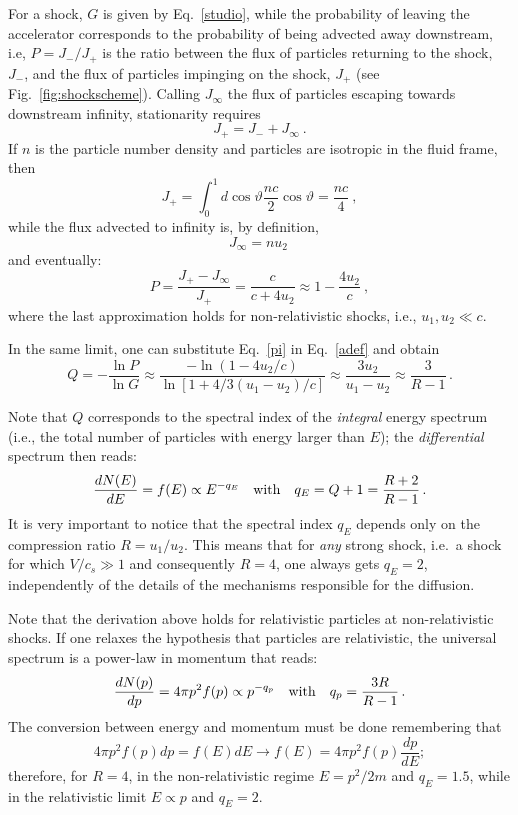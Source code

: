 \documentclass[varenna]{cimento}
\begin{document}
For a shock, $G$ is given by Eq.~\ref{studio}, while the probability of leaving the accelerator corresponds to the probability of being advected away downstream, i.e, $P=J_-/J_+$ is the ratio between the flux of particles returning to the shock, $J_-$, and the flux of particles impinging on the shock, $J_+$ (see Fig.~\ref{fig:shockscheme}).
Calling $J_\infty$ the flux of particles escaping towards downstream infinity, stationarity requires
\begin{equation}
	J_+=J_-+J_\infty~.
\end{equation}
If $n$ is the particle number density and particles are isotropic in the fluid frame, then
\begin{equation}	J_+=\int^{1}_{0}d\cos\vartheta\frac{nc}{2}\cos\vartheta=\frac{nc}{4}~,
\end{equation}
while the flux advected to infinity is, by definition,
\begin{equation}
	J_\infty=nu_2~
\end{equation}
and eventually:
\begin{equation}\label{pi}	P=\frac{J_+-J_\infty}{J_+}=\frac{c}{c+4u_2}\approx1-\frac{4u_2}{c}~,
\end{equation}
where the last approximation holds for non-relativistic shocks, i.e., $u_1,u_2\ll c$.

In the same limit, one can substitute Eq.~\ref{pi} in Eq.~\ref{adef} and obtain
\begin{equation}\label{eq:bell}
	Q=-\frac{\ln P}{\ln G}\approx \frac{-\ln(1-4u_2/c)}{\ln{[1+4/3(u_1-u_2)/c]}}\approx \frac{3u_2}{u_1-u_2}\approx\frac{3}{R-1}\,.
\end{equation}

Note that $Q$ corresponds to the spectral index of the \emph{integral} energy spectrum (i.e., the total number of particles with energy larger than $E$);  
the \emph{differential} spectrum then reads:
\begin{equation}\label{specslope}
	\frac{dN(E)}{dE}=f(E)\propto E^{-q_E}\quad {\rm with}\quad
	q_E=Q+1=\frac{R+2}{R-1}\,.
\end{equation}
It is very important to notice that the spectral index $q_E$ depends only on the compression ratio $R=u_1/u_2$.
This means that for \emph{any} strong shock, i.e.\ a shock for which $V/c_s\gg 1$ and consequently $R=4$, one always gets $q_E=2$, independently of the details of the mechanisms responsible for the diffusion.

Note that the derivation above holds for relativistic particles at non-relativistic shocks.
If one relaxes the hypothesis that particles are relativistic, the universal spectrum is a power-law in momentum that reads:
\begin{equation}\label{eq:DSA}
    \frac{dN(p)}{dp}=4\pi p^2 f(p)\propto p^{-q_p}\quad {\rm with}\quad q_p=\frac{3R}{R-1}\,.
\end{equation}
The conversion between energy and momentum must be done remembering that 
\begin{equation}
4\pi p^2 f(p)dp= f(E)dE \to f(E)=4\pi p^2 f(p)\frac{dp}{dE};
\end{equation}
therefore, for $R=4$, in the non-relativistic regime $E=p^2/2m$ and $q_E=1.5$, while 
in the relativistic limit $E\propto p$ and $q_E=2$.
\end{document}
